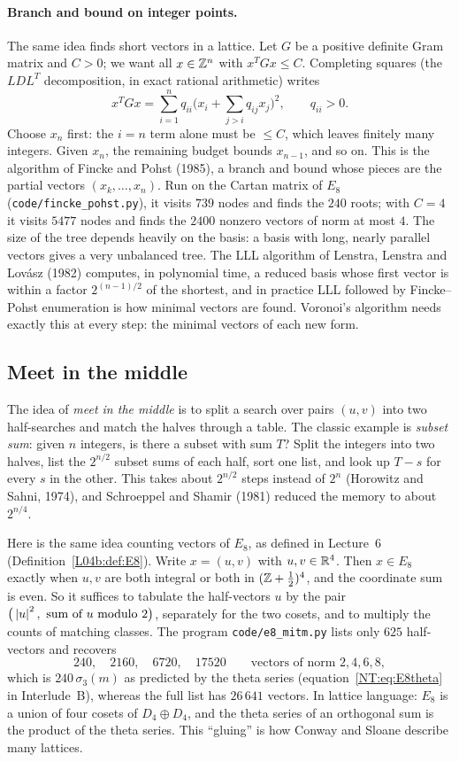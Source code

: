 \paragraph{Branch and bound on integer points.} The same idea finds short vectors in a lattice. Let $G$ be
a positive definite Gram matrix and $C>0$; we want all $x\in\mathbb{Z}^n$ with $x^TGx\le C$. Completing squares
(the $LDL^T$ decomposition, in exact rational arithmetic) writes
\[
  x^TGx=\sum_{i=1}^nq_{ii}\Big(x_i+\sum_{j>i}q_{ij}x_j\Big)^2,\qquad q_{ii}>0 .
\]
Choose $x_n$ first: the $i=n$ term alone must be $\le C$, which leaves finitely many integers. Given
$x_n$, the remaining budget bounds $x_{n-1}$, and so on. This is the algorithm of Fincke and Pohst
(1985), a branch and bound whose pieces are the partial vectors $(x_k,\dots,x_n)$. Run on the Cartan
matrix of $E_8$ (\texttt{code/fincke\_pohst.py}), it visits $739$ nodes and finds the $240$ roots; with
$C=4$ it visits $5477$ nodes and finds the $2400$ nonzero vectors of norm at most $4$. The size of the
tree depends heavily on the basis: a basis with long, nearly parallel vectors gives a very unbalanced
tree. The LLL algorithm of Lenstra, Lenstra and Lov\'asz (1982) computes, in polynomial time, a reduced
basis whose first vector is within a factor $2^{(n-1)/2}$ of the shortest, and in practice LLL followed by
Fincke--Pohst enumeration is how minimal vectors are found. Voronoi's algorithm needs exactly this at
every step: the minimal vectors of each new form.

\subsection{Meet in the middle}
The idea of \emph{meet in the middle} is to split a search over pairs $(u,v)$ into two half-searches and
match the halves through a table. The classic example is \emph{subset sum}: given $n$ integers, is there
a subset with sum $T$? Split the integers into two halves, list the $2^{n/2}$ subset sums of each half, sort
one list, and look up $T-s$ for every $s$ in the other. This takes about $2^{n/2}$ steps instead of $2^n$
(Horowitz and Sahni, 1974), and Schroeppel and Shamir (1981) reduced the memory to about $2^{n/4}$.

Here is the same idea counting vectors of $E_8$, as defined in Lecture~6
(Definition~\ref{L04b:def:E8}). Write $x=(u,v)$ with $u,v\in\mathbb{R}^4$. Then $x\in E_8$ exactly when $u,v$ are
both integral or both in $(\mathbb{Z}+\frac12)^4$, and the coordinate sum is even. So it suffices to tabulate the
half-vectors $u$ by the pair $\big(\left\lvert u \right\rvert^2,\ \text{sum of $u$ modulo }2\big)$, separately for the two
cosets, and to multiply the counts of matching classes. The program \texttt{code/e8\_mitm.py} lists only
$625$ half-vectors and recovers
\[
  240,\quad 2160,\quad 6720,\quad 17520\qquad\text{vectors of norm }2,4,6,8,
\]
which is $240\,\sigma_3(m)$ as predicted by the theta series (equation~\eqref{NT:eq:E8theta} in
Interlude~B), whereas the full list has $26\,641$ vectors. In lattice language: $E_8$ is a union of four cosets of
$D_4\oplus D_4$, and the theta series of an orthogonal sum is the product of the theta series. This
``gluing'' is how Conway and Sloane describe many lattices.

